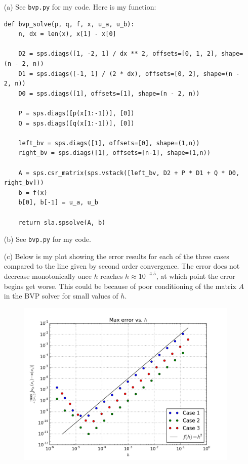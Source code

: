 \documentclass[10pt]{article}
\begin{document}
\begin{itemize}

\item[(a)] See \verb+bvp.py+ for my code. Here is my function:  \begin{lstlisting} 
def bvp_solve(p, q, f, x, u_a, u_b):
    n, dx = len(x), x[1] - x[0]
    
    D2 = sps.diags([1, -2, 1] / dx ** 2, offsets=[0, 1, 2], shape=(n - 2, n))
    D1 = sps.diags([-1, 1] / (2 * dx), offsets=[0, 2], shape=(n - 2, n))
    D0 = sps.diags([1], offsets=[1], shape=(n - 2, n))
    
    P = sps.diags([p(x[1:-1])], [0])
    Q = sps.diags([q(x[1:-1])], [0])
    
    left_bv = sps.diags([1], offsets=[0], shape=(1,n))
    right_bv = sps.diags([1], offsets=[n-1], shape=(1,n))
    
    A = sps.csr_matrix(sps.vstack([left_bv, D2 + P * D1 + Q * D0, right_bv]))
    b = f(x)
    b[0], b[-1] = u_a, u_b
    
    return sla.spsolve(A, b)
\end{lstlisting}

\item[(b)] See \verb+bvp.py+ for my code.

\item[(c)] Below is my plot showing the error results for each of the three cases compared to the line given by second order convergence. The error does not decrease monotonically once $h$ reaches $ h \approx 10^{-4.5} $, at which point the error begins get worse. This could be because of poor conditioning of the matrix $A$ in the BVP solver for small values of $h$.

\begin{figure}[H]
  \centering
    \includegraphics[scale=0.6]{errors}
\end{figure}


\end{itemize}
\end{document}
